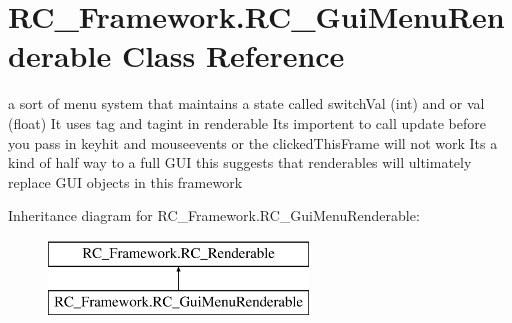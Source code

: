 \hypertarget{class_r_c___framework_1_1_r_c___gui_menu_renderable}{}\section{R\+C\+\_\+\+Framework.\+R\+C\+\_\+\+Gui\+Menu\+Renderable Class Reference}
\label{class_r_c___framework_1_1_r_c___gui_menu_renderable}


a sort of menu system that maintains a state called switch\+Val (int) and or val (float) It uses tag and tagint in renderable Its importent to call update before you pass in keyhit and mouseevents or the clicked\+This\+Frame will not work Its a kind of half way to a full G\+UI this suggests that renderables will ultimately replace G\+UI objects in this framework  


Inheritance diagram for R\+C\+\_\+\+Framework.\+R\+C\+\_\+\+Gui\+Menu\+Renderable\+:\begin{figure}[H]
\begin{center}
\leavevmode
\includegraphics[height=2.000000cm]{class_r_c___framework_1_1_r_c___gui_menu_renderable}
\end{center}
\end{figure}
